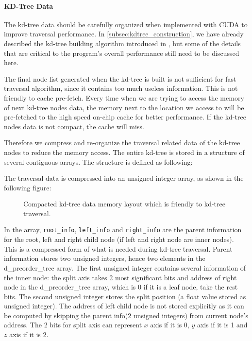 \paragraph{KD-Tree Data}

The kd-tree data should be carefully organized when implemented with CUDA to improve traversal performance. In \ref{subsec:kdtree_construction}, we have already described the kd-tree building algorithm introduced in \cite{Zhou2008}, but some of the details that are critical to the program's overall performance still need to be discussed here.

The final node list generated when the kd-tree is built is not sufficient for fast traversal algorithm, since it contains too much useless information. This is not friendly to cache pre-fetch. Every time when we are trying to access the memory of next kd-tree nodes data, the memory next to the location we access to will be pre-fetched to the high speed on-chip cache for better performance. If the kd-tree nodes data is not compact, the cache will miss. 
 
Therefore we compress and re-organize the traversal related data of the kd-tree nodes to reduce the memory access. The entire kd-tree is stored in a structure of several contiguous arrays. The structure is defined as following:



The traversal data is compressed into an unsigned integer array, as shown in the following figure:

\begin{figure}[htp]
    \centering
    \renewcommand{\thefigure}{\thechapter.\arabic{figure}}
    \caption[Compacted memory layout of constructed kd-tree data]{Compacted kd-tree data memory layout which is friendly to kd-tree traversal.}
    \label{fig:kdtree_data_memory_layout}
\end{figure}

In the array, {\tt root\_info}, {\tt left\_info} and {\tt right\_info} are the parent information for the root, left and right child node (if left and right node are inner nodes). This is a compressed form of what is needed during kd-tree traversal. Parent information stores two unsigned integers, hence two elements in the d\_preorder\_tree array. The first unsigned integer contains several information of the inner node: the split axis takes 2 most significant bits and address of right node in the d\_preorder\_tree array, which is 0 if it is a leaf node, take the rest bits. The second unsigned integer stores the split position (a float value stored as unsigned integer). The address of left child node is not stored explicitly as it can be computed by skipping the parent info(2 unsigned integers) from current node's address. The 2 bits for split axis can represent \(x\) axis if it is 0, \(y\) axis if it is 1 and \(z\) axis if it is 2.

